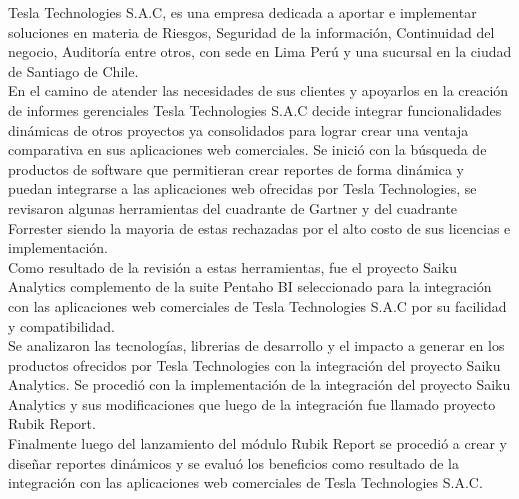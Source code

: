 \makeatletter
\newenvironment{abstract}{%
	\titlepage
	\null\vfil
	\@beginparpenalty\@lowpenalty
	\begin{center}%
		\large\bfseries\abstractname
		\@endparpenalty\@M
	\end{center}
}%
{\par\vfil\null
	\endtitlepage}
\makeatother

\begin{titlepage}
	 \begin{abstract}
		\begin{spacing}{1.5}
		Tesla Technologies S.A.C, es una empresa dedicada a aportar e implementar soluciones en materia de Riesgos, Seguridad de la información, Continuidad del negocio, Auditoría entre otros, con sede en Lima Perú y una sucursal en la ciudad de Santiago de Chile.\\	
		En el camino de atender las necesidades de sus clientes y apoyarlos en la creación de informes gerenciales Tesla Technologies S.A.C decide integrar funcionalidades dinámicas de otros proyectos ya consolidados para lograr crear una ventaja comparativa en sus aplicaciones web comerciales.
		Se inició con la búsqueda de productos de software que permitieran crear reportes de forma dinámica y puedan integrarse a las aplicaciones web ofrecidas por Tesla Technologies, se revisaron algunas herramientas del cuadrante de Gartner y del cuadrante Forrester siendo la mayoria de estas rechazadas por el alto costo de sus licencias e implementación.\\
		Como resultado de la revisión a estas herramientas, fue el proyecto Saiku Analytics complemento de la suite Pentaho BI seleccionado para la integración con las aplicaciones web comerciales de Tesla Technologies S.A.C por su facilidad y compatibilidad.\\
		Se analizaron las tecnologías, librerias de desarrollo y el impacto a generar en los productos ofrecidos por Tesla Technologies con la integración del proyecto Saiku Analytics.
		Se procedió con la implementación de la integración del proyecto Saiku Analytics y sus modificaciones que luego de la integración fue llamado proyecto Rubik Report.\\
		Finalmente luego del lanzamiento del módulo Rubik Report se procedió a crear y diseñar reportes dinámicos y se evaluó los beneficios como resultado de la integración con las aplicaciones web comerciales de Tesla Technologies S.A.C.\\		
		\end{spacing}
	\end{abstract}
\end{titlepage}
